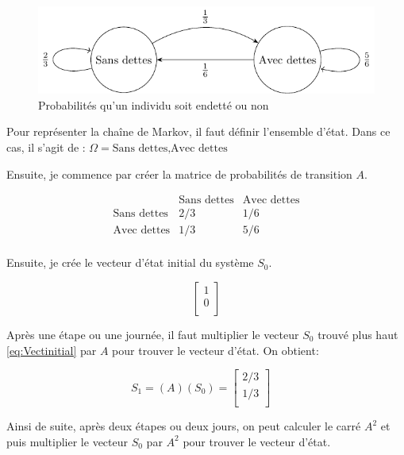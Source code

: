 \documentclass[10pt]{article}
\begin{document}
\begin{figure}[H]
	\centering
	\includegraphics[scale=0.8]{dette.pdf}
	\caption{Probabilités qu'un individu soit endetté ou non}
\end{figure}

Pour représenter la chaîne de Markov, il faut définir l'ensemble d'état. Dans ce cas, il s'agit de :
$\Omega={\text{Sans dettes}, \text{Avec dettes}}$


Ensuite, je commence par créer la matrice de probabilités de transition $A$.


\[
        \begin{array}{c|cc}
	 & \text{Sans dettes} & \text{Avec dettes}\\
	\hline
	\text{Sans dettes} & 2/3 & 1/6\\
	\text{Avec dettes} & 1/3 & 5/6\\
	\end{array}
\]

Ensuite,  je crée le vecteur d'état initial du système $S_0$.


\begin{equation}
\label{eq:Vectinitial}
	\begin{bmatrix} 
	1\\
	0\\
	\end{bmatrix}
\end{equation}




Après une étape ou une journée, il faut multiplier le vecteur $S_0$ trouvé plus haut \eqref{eq:Vectinitial}  par $A$ pour trouver le vecteur d'état.
On obtient:


\begin{equation}
S_1 = (A)(S_0)= 	\begin{bmatrix} 
	2/3\\
	1/3\\
	\end{bmatrix}
	\quad
\end{equation}


Ainsi de suite, après deux étapes ou deux jours, on peut calculer le carré $A^2$ et puis multiplier le vecteur $S_0$ par $A^2$ pour trouver le vecteur d'état.
\end{document}
